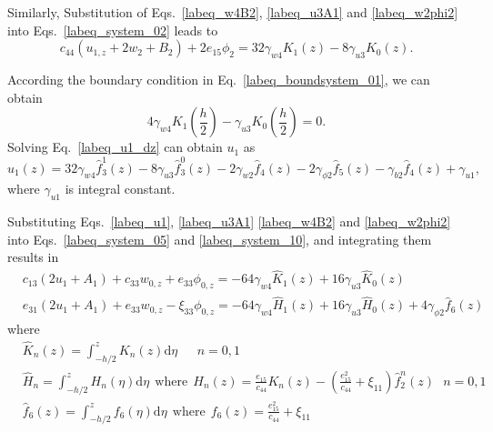 \documentclass[12pt,sort&compress,fleqn,3p]{elsarticle}
\newcommand{\er}[4]{{#1}_{#2}{#3}_{#4}}
\newcommand{\de}[5]{{#1}_{#2}{#3}_{{#4},{#5}}}
\begin{document}
Similarly,  Substitution of  Eqs.~\eqref{labeq_w4B2}, \eqref{labeq_u3A1}  and  \eqref{labeq_w2phi2} into     Eqs.~\eqref{labeq_system_02}   leads  to
\begin{equation}\label{labeq_u1_dz}
c_{44}(u_{1,z}+2w_{2}+B_{2})+2\er{e}{15}{\phi}{2}=32\gamma_{w4}K_{1}(z)-8\gamma_{u3}K_{0}(z).
\end{equation}

According the boundary condition in Eq.~\eqref{labeq_boundsystem_01}, we can obtain
\begin{equation}\label{labeq_w4u3_constrain}
4\gamma_{w4}K_{1}(\dfrac{h}{2})-\gamma_{u3}K_{0}(\dfrac{h}{2})=0.
\end{equation}
Solving Eq.~\eqref{labeq_u1_dz} can  obtain $u_1$ as
\begin{equation}\label{labeq_u1}
u_{1}(z)=32\gamma_{w4}\hat{f}^1_{3}(z)-8\gamma_{u3}\hat{f}^0_{3}(z)- 2\gamma_{w2}\hat{f}_4(z) - 2\gamma_{\phi2}\hat{f}_5(z)   - \gamma_{b2}\hat{f}_4(z)  +\gamma_{u1},
\end{equation}
where $\gamma_{u1}$ is integral constant.




Substituting Eqs.~\eqref{labeq_u1}, \eqref{labeq_u3A1}  \eqref{labeq_w4B2} and  \eqref{labeq_w2phi2}  into Eqs.~\eqref{labeq_system_05} and \eqref{labeq_system_10},  and integrating them  results in
\begin{equation}\label{labeq_w0phi0_dz0}
\begin{split}
&c_{13}(2u_{1}+A_{1})+c_{33}w_{0,z}+\de{e}{33}{\phi}{0}{z}=-64\gamma_{w4}\hat{K}_{1}(z)+16\gamma_{u3}\hat{K}_{0}(z)\\
&e_{31}(2u_{1}+A_{1})+e_{33}w_{0,z}-\de{\xi}{33}{\phi}{0}{z}=-64\gamma_{w4}\hat{H}_{1}(z)+16\gamma_{u3}\hat{H}_{0}(z)+4\gamma_{\phi2} \hat{f}_6(z)
\end{split}
\end{equation}
where
\begin{equation}\label{labeq_knhnq_define}
\begin{split}
&\hat{K}_{n}(z)=\int_{-h/2}^{z}K_{n}(z)\mathrm{d}\eta ~~~~~~~n=0,1\\
&\hat{H}_{n}=\int_{-h/2}^{z} H_{n}(\eta)  \mathrm{d}\eta ~~\text{where}~~ H_{n}(z) =  \frac{e_{15}}{c_{44}}K_{n}(z)-\left(\frac{e_{15}^{2}}{c_{44}}+\xi_{11}\right) \hat{f}^{n}_{2}(z) ~~~n=0,1\\
&\hat{f}_6({z})=\int_{-h/2}^{z} f_6(\eta) \mathrm{d}\eta  ~~\text{where}~~  f_6(z) =  \frac{e_{15}^{2}}{c_{44}} +\xi_{11}
\end{split}
\end{equation}
\end{document}
